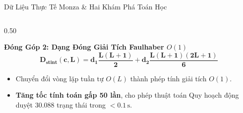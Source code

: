 \documentclass[aspectratio=169, 10pt]{beamer}
\begin{document}
\begin{frame}{Dữ Liệu Thực Tế Monza \& Hai Khám Phá Toán Học}
\begin{columns}[T]
\begin{column}{0.50\textwidth}
      \begin{exampleblock}{\textbf{Đóng Góp 2: Dạng Đóng Giải Tích Faulhaber $O(1)$}}
        \scriptsize
        \[
          \mathbf{D_{\text{stint}}(c, L) = d_1 \frac{L(L+1)}{2} + d_2 \frac{L(L+1)(2L+1)}{6}}
        \]
        \begin{itemize}
          \item Chuyển đổi vòng lặp tuần tự $O(L)$ thành phép tính giải tích \textbf{$O(1)$}.
          \item \textbf{Tăng tốc tính toán gấp 50 lần}, cho phép thuật toán Quy hoạch động duyệt 30.088 trạng thái trong $< 0.1\,\text{s}$.
        \end{itemize}
      \end{exampleblock}
    \end{column}
  \end{columns}
\end{frame}
\end{document}
